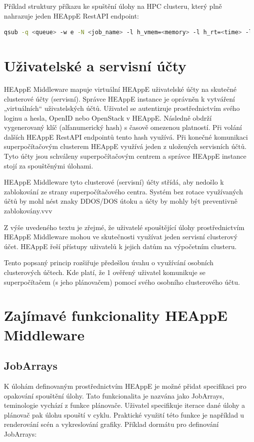 Příklad struktury příkazu ke spuštění úlohy na HPC clusteru, který plně nahrazuje jeden HEAppE RestAPI endpoint:

\begin{lstlisting}[language=bash,caption={Struktura příkazu qsub \cite{iR8VZfeCCZ757gs1}}]
qsub -q <queue> -w e -N <job_name> -l h_vmem=<memory> -l h_rt=<time> -l s_rt=<time> -pe smp <num_slots> -o <outputlogfile> -e <errorlogfile> <pathtoScript> <arg1> <arg2>
\end{lstlisting}

\section{Uživatelské a servisní účty}
HEAppE Middleware mapuje virtuální HEAppE uživatelské účty na skutečné clusterové účty (servisní). Správce HEAppE instance je oprávněn k vytváření „virtuálních“ uživatelských účtů. Uživatel se autentizuje prostřednictvím svého loginu a hesla, OpenID nebo OpenStack v HEAppE. Následně obdrží vygenerovaný klíč (alfanumerický hash) s časově omezenou platností. Při volání dalších HEAppE RestAPI endpointů tento hash využívá. Při konečné komunikaci superpočítačovým clusterem HEAppE využívá jeden z uložených servisních účtů. Tyto účty jsou schváleny superpočítačovým centrem a správce HEAppE instance stojí za spouštěnými úlohami. 

HEAppE Middleware tyto clusterové (servisní) účty střídá, aby nedošlo k zablokování ze strany superpočítačového centra. Systém bez rotace využívaných účtů by mohl nést znaky DDOS/DOS útoku a účty by mohly být preventivně zablokovány.vvv

Z výše uvedeného textu je zřejmé, že uživatelé spouštějící úlohy prostřednictvím HEAppE Middleware mohou ve skutečnosti využívat jeden servisní clusterový účet. HEAppE řeší přístupy uživatelů k jejich datům na výpočetním clusteru.

Tento popsaný princip rozšiřuje předešlou úvahu o využívání osobních clusterových účtech. Kde platí, že 1 ověřený uživatel komunikuje se superpočítačem (s jeho plánovačem) pomocí svého osobního clusterového účtu.

\section{Zajímavé funkcionality HEAppE Middleware}
\subsection{JobArrays}
K úlohám definovaným prostřednictvím HEAppE je možné přidat specifikaci pro opakování spouštění úlohy. Tato funkcionalita je nazvána jako JobArrays, teminologie vychází z funkce plánovače. Uživatel specifikuje iterace dané úlohy a plánovač pak úlohu spouští v cyklu. Praktické využití této funkce je například u renderování scén a vykreslování grafiky.
Příklad dormátu pro definování JobArrays:


